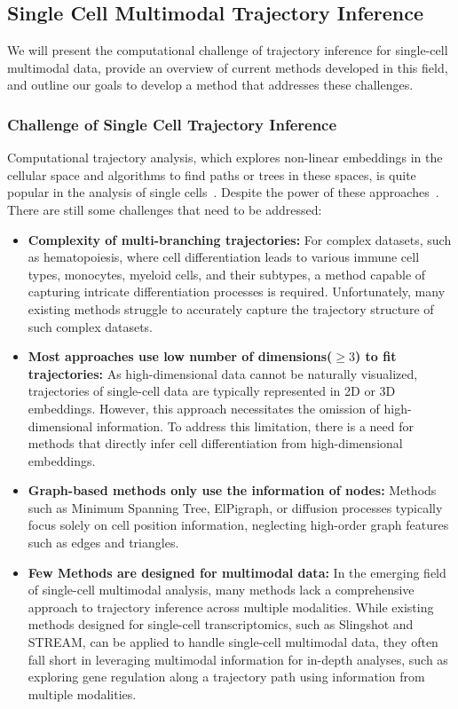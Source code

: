 \subsection{Single Cell Multimodal Trajectory Inference}
We will present the computational challenge of trajectory inference for single-cell multimodal data, provide an overview of current methods developed in this field, and outline our goals to develop a method that addresses these challenges.

\subsubsection{Challenge of Single Cell Trajectory Inference}
\label{background:sec2:challenge_TI}
Computational trajectory analysis, which explores non-linear embeddings in the cellular space and algorithms to find paths or trees in these spaces, is quite popular in the analysis of single cells~\citep{wolf2019paga,chen2019stream,street2018slingshot,Lynch2022}. Despite the power of these approaches~\citep{Saelens2019}. There are still some challenges that need to be addressed:

\begin{itemize}
	\item \textbf{Complexity of multi-branching trajectories:}
	For complex datasets, such as hematopoiesis, where cell differentiation leads to various immune cell types, monocytes, myeloid cells, and their subtypes, a method capable of capturing intricate differentiation processes is required. Unfortunately, many existing methods struggle to accurately capture the trajectory structure of such complex datasets.

	\item \textbf{Most approaches use low number of dimensions($\geq3$) to fit trajectories:}
	As high-dimensional data cannot be naturally visualized, trajectories of single-cell data are typically represented in 2D or 3D embeddings. However, this approach necessitates the omission of high-dimensional information. To address this limitation, there is a need for methods that directly infer cell differentiation from high-dimensional embeddings.

	\item \textbf{Graph-based methods only use the information of nodes:}
	Methods such as Minimum Spanning Tree, ElPigraph, or diffusion processes typically focus solely on cell position information, neglecting high-order graph features such as edges and triangles.

	\item \textbf{Few Methods are designed for multimodal data:}
	In the emerging field of single-cell multimodal analysis, many methods lack a comprehensive approach to trajectory inference across multiple modalities. While existing methods designed for single-cell transcriptomics, such as Slingshot and STREAM, can be applied to handle single-cell multimodal data, they often fall short in leveraging multimodal information for in-depth analyses, such as exploring gene regulation along a trajectory path using information from multiple modalities.
\end{itemize}

